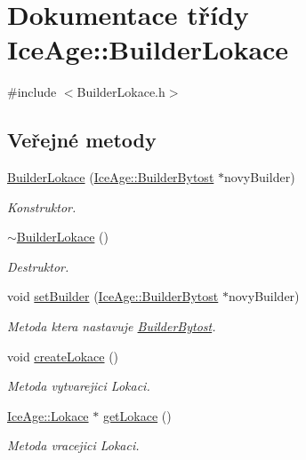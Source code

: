 \hypertarget{classIceAge_1_1BuilderLokace}{}\section{Dokumentace třídy Ice\+Age\+:\+:Builder\+Lokace}
\label{classIceAge_1_1BuilderLokace}


{\ttfamily \#include $<$Builder\+Lokace.\+h$>$}

\subsection*{Veřejné metody}
\begin{DoxyCompactItemize}
\item 
\hyperlink{classIceAge_1_1BuilderLokace_ad8fabba0bddf2d2569c36fa115f40673}{Builder\+Lokace} (\hyperlink{classIceAge_1_1BuilderBytost}{Ice\+Age\+::\+Builder\+Bytost} $\ast$novy\+Builder)
\begin{DoxyCompactList}\small\item\em Konstruktor. \end{DoxyCompactList}\item 
\hyperlink{classIceAge_1_1BuilderLokace_ae90ede622f89433692f5d4c17fd35ffb}{$\sim$\+Builder\+Lokace} ()
\begin{DoxyCompactList}\small\item\em Destruktor. \end{DoxyCompactList}\item 
void \hyperlink{classIceAge_1_1BuilderLokace_acce53b24cfb8ab5227520e943e6b843b}{set\+Builder} (\hyperlink{classIceAge_1_1BuilderBytost}{Ice\+Age\+::\+Builder\+Bytost} $\ast$novy\+Builder)
\begin{DoxyCompactList}\small\item\em Metoda ktera nastavuje \hyperlink{classIceAge_1_1BuilderBytost}{Builder\+Bytost}. \end{DoxyCompactList}\item 
void \hyperlink{classIceAge_1_1BuilderLokace_ac46d7d1ff685c51dbd382f65b29a6546}{create\+Lokace} ()
\begin{DoxyCompactList}\small\item\em Metoda vytvarejici Lokaci. \end{DoxyCompactList}\item 
\hyperlink{classIceAge_1_1Lokace}{Ice\+Age\+::\+Lokace} $\ast$ \hyperlink{classIceAge_1_1BuilderLokace_ada96fb10689d0b6f2ed2f7cdc31a171e}{get\+Lokace} ()
\begin{DoxyCompactList}\small\item\em Metoda vracejici Lokaci. \end{DoxyCompactList}\item 

\end{DoxyCompactItemize}
